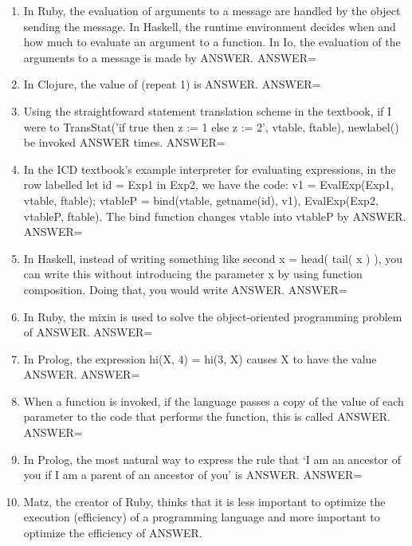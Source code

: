 \documentclass{exam}
\begin{document}
\begin{enumerate}
\item In Ruby, the evaluation of arguments to a message are handled by the object sending the message.  In Haskell, the runtime environment decides when and how much to evaluate an argument to a function.  In Io, the evaluation of the arguments to a message is made by ANSWER.\newline
ANSWER=
\item In Clojure, the value of (repeat 1) is ANSWER.\newline
ANSWER=
\item Using the straightfoward statement translation scheme in the textbook, if I were to TransStat('if true then z := 1 else z := 2', vtable, ftable), newlabel() be invoked ANSWER times.\newline
ANSWER=
\item In the ICD textbook's example interpreter for evaluating expressions, in the row labelled let id = Exp1 in Exp2, we have the code: v1 = EvalExp(Exp1, vtable, ftable); vtableP = bind(vtable, getname(id), v1), EvalExp(Exp2, vtableP, ftable).  The bind function changes vtable into vtableP by ANSWER.\newline
ANSWER=
\item In Haskell, instead of writing something like second x = head( tail(  x ) ), you can write this without introducing the parameter x by using function composition.  Doing that, you would write ANSWER.\newline
ANSWER=
\item In Ruby, the mixin is used to solve the object-oriented programming problem of ANSWER.\newline
ANSWER=
\item In Prolog, the expression hi(X, 4) = hi(3, X) causes X to have the value ANSWER.\newline
ANSWER=
\item When a function is invoked, if the language passes a copy of the value of each parameter to the code that performs the function, this is called ANSWER.\newline
ANSWER=
\item In Prolog, the most natural way to express the rule that `I am an ancestor of you if I am a parent of an ancestor of you' is ANSWER.\newline
ANSWER=
\item Matz, the creator of Ruby, thinks that it is less important to optimize the execution (efficiency) of a programming language and more important to optimize the efficiency of ANSWER.\newline

\end{enumerate}
\end{document}
